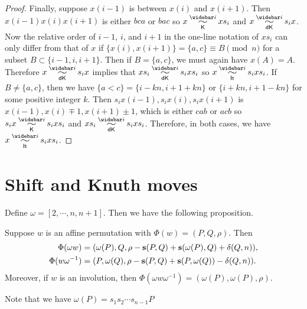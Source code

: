 \documentclass[11pt]{article}
\begin{document}
\begin{proof}
Finally, suppose 
 $x(i-1)$ is between $x(i)$ and $x(i+1)$. Then $x(i-1)x(i)x(i+1)$ is either $bca$ or $bac$ so $x\K{\widebar i}xs_{i}$
 and $x\dK{\widebar i} s_{i}x$. 
Now the relative order of $i-1$, $i$, and $i+1$ in the one-line notation of $xs_{i}$
 can only differ from that of $x$ if $\{x(i),x(i+1)\} = \{a,c\}\equiv B\pmod{n}$ for a subset $B\subset \{i-1,i,i+1\}$. Then if $B=\{a,c\}$, we must again have $x(A)=A$. Therefore $x\dK{\widebar i} s_{i} x$ implies that $xs_{i} \dK{\widebar i} s_{i} x s_{i}$ so  $x\simRBS{\widebar i} s_{i}x s_{i}$.
If $B\neq\{a,c\}$, then we have $\{a<c\}=\{i-kn,i+1+kn\}$ or $\{i+kn,i+1-kn\}$ for some positive integer $k$. Then $s_ix(i-1),s_ix(i),s_ix(i+1)$ is $x(i-1),x(i)\mp1,x(i+1)\pm1$, which is either $cab$ or $acb$ so $s_ix\K{\widebar i}s_ixs_i$ and $xs_i\dK{\widebar i}s_ixs_i$. Therefore, in both cases, we have $x\simRBS{\widebar i} s_{i}x s_{i}$.
\end{proof}

\section{Shift and Knuth moves}\label{shift-sect}
Define $\omega=[2,\cdots,n,n+1]$. Then we have the following proposition.

\begin{proposition}[{\cite[Proposition 5.5]{KP}}]\label{omega_prop}
Suppose $w$ is an affine permutation with $\Phi(w)=(P,Q,\rho)$. Then 
\begin{align*}
\Phi(\omega w)&=(\omega(P),Q,\rho-\bold{s}(P,Q)+\bold{s}(\omega(P),Q)+\delta(Q,n)),\\
\Phi(w\omega^{-1})&=(P,\omega(Q),\rho-\bold{s}(P,Q)+\bold{s}(P,\omega(Q))-\delta(Q,n)).
\end{align*}
Moreover, if $w$ is an involution, then $\Phi(\omega w\omega^{-1})=(\omega(P),\omega(P),\rho)$.
\end{proposition}
Note that we have $\omega(P)=s_1s_2\cdots s_{n-1}P$
\end{document}
